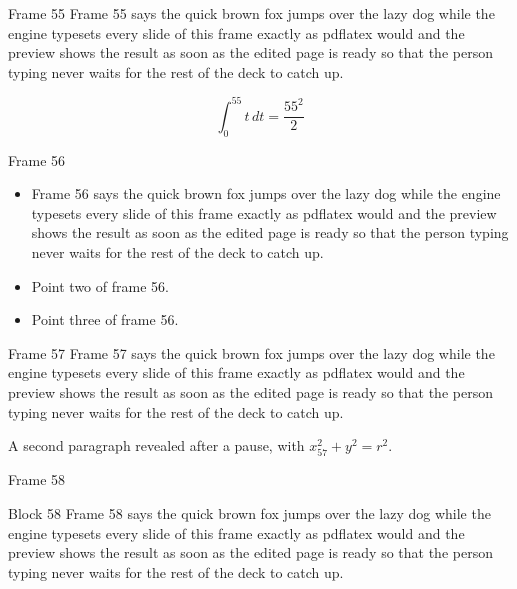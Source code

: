 \documentclass{beamer}
\begin{document}
\begin{frame}{Frame 55}
  Frame 55 says the quick brown fox jumps over the lazy dog while the engine typesets every slide of this frame exactly as pdflatex would and the preview shows the result as soon as the edited page is ready so that the person typing never waits for the rest of the deck to catch up.

  \[ \int_0^{55} t\,dt = \frac{55^2}{2} \]
\end{frame}
\begin{frame}{Frame 56}
  \begin{itemize}
    \item<1-> Frame 56 says the quick brown fox jumps over the lazy dog while the engine typesets every slide of this frame exactly as pdflatex would and the preview shows the result as soon as the edited page is ready so that the person typing never waits for the rest of the deck to catch up.
    \item<2-> Point two of frame 56.
    \item<3-> Point three of frame 56.
  \end{itemize}
\end{frame}
\begin{frame}{Frame 57}
  Frame 57 says the quick brown fox jumps over the lazy dog while the engine typesets every slide of this frame exactly as pdflatex would and the preview shows the result as soon as the edited page is ready so that the person typing never waits for the rest of the deck to catch up.
  \pause

  A second paragraph revealed after a pause, with $x_{57}^2 + y^2 = r^2$.
\end{frame}
\begin{frame}{Frame 58}
  \begin{block}{Block 58}
    Frame 58 says the quick brown fox jumps over the lazy dog while the engine typesets every slide of this frame exactly as pdflatex would and the preview shows the result as soon as the edited page is ready so that the person typing never waits for the rest of the deck to catch up.
  \end{block}
\end{frame}
\end{document}
